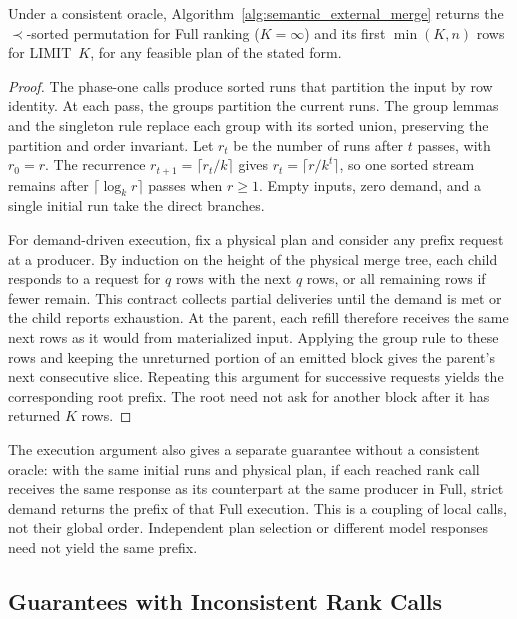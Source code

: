\begin{theorem}
Under a consistent oracle, Algorithm~\ref{alg:semantic_external_merge} returns the $\prec$-sorted permutation for Full ranking ($K=\infty$) and its first $\min(K,n)$ rows for \textsf{LIMIT}~$K$, for any feasible plan of the stated form.
\end{theorem}
\begin{proof}
The phase-one calls produce sorted runs that partition the input by row identity. At each pass, the groups partition the current runs. The group lemmas and the singleton rule replace each group with its sorted union, preserving the partition and order invariant. Let $r_t$ be the number of runs after $t$ passes, with $r_0=r$. The recurrence $r_{t+1}=\lceil r_t/k\rceil$ gives $r_t=\lceil r/k^t\rceil$, so one sorted stream remains after $\lceil\log_k r\rceil$ passes when $r\ge1$. Empty inputs, zero demand, and a single initial run take the direct branches.

For demand-driven execution, fix a physical plan and consider any prefix request at a producer. By induction on the height of the physical merge tree, each child responds to a request for $q$ rows with the next $q$ rows, or all remaining rows if fewer remain. This contract collects partial deliveries until the demand is met or the child reports exhaustion. At the parent, each refill therefore receives the same next rows as it would from materialized input. Applying the group rule to these rows and keeping the unreturned portion of an emitted block gives the parent's next consecutive slice. Repeating this argument for successive requests yields the corresponding root prefix. The root need not ask for another block after it has returned $K$ rows.
\end{proof}

The execution argument also gives a separate guarantee without a consistent oracle: with the same initial runs and physical plan, if each reached rank call receives the same response as its counterpart at the same producer in Full, strict demand returns the prefix of that Full execution. This is a coupling of local calls, not their global order. Independent plan selection or different model responses need not yield the same prefix.

\subsection{Guarantees with Inconsistent Rank Calls}
\label{app:proof-inconsistent}


